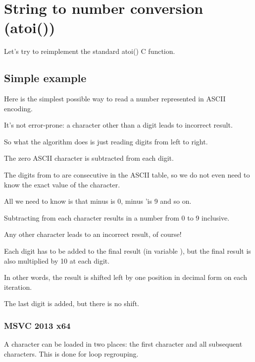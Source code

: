 \section{String to number conversion (atoi())}


Let's try to reimplement the standard atoi() C function.

\subsection{Simple example}

Here is the simplest possible way to read a number represented in \ac{ASCII} encoding.

It's not error-prone: a character other than a digit leads to incorrect result.



So what the algorithm does is just reading digits from left to right.

The zero \ac{ASCII} character is subtracted from each digit. 

The digits from  to  are consecutive in the \ac{ASCII} table, so 
we do not even need to know the exact value of the  character.

All we need to know is that  minus  is 0,  minus 'is 9 and so on.

Subtracting  from each character results in a number from 0 to 9 inclusive.

Any other character leads to an incorrect result, of course!

Each digit has to be added to the final result (in variable ), but the final result
is also multiplied by 10 at each digit.

In other words, the result is shifted left by one position in decimal form on each iteration.

The last digit is added, but there is no shift.

\subsubsection{\Optimizing MSVC 2013 x64}



A character can be loaded in two places: the first character and all subsequent characters.
This is done for loop regrouping.

